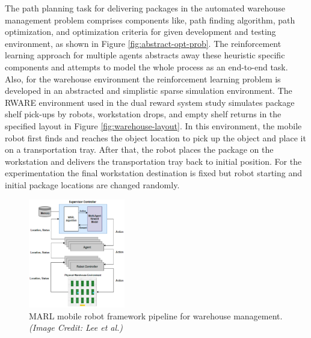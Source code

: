\documentclass{article}
\begin{document}
The path planning task for delivering packages in the automated warehouse management problem comprises components like, path finding algorithm, path optimization, and optimization criteria for given development and testing environment, as shown in Figure \ref{fig:abstract-opt-prob}.
The reinforcement learning approach for multiple agents abstracts away these heuristic specific components and attempts to model the whole process as an end-to-end task. 
Also, for the warehouse environment the reinforcement learning problem is developed in an abstracted and simplistic sparse simulation environment.
The RWARE environment used in the dual reward system study simulates package shelf pick-ups by robots, workstation drops, and empty shelf returns in the specified layout in Figure \ref{fig:warehouse-layout}.
In this environment, the mobile robot first finds and reaches the object location to pick up the object and place it on a transportation tray.
After that, the robot places the package on the workstation and delivers the transportation tray back to initial position.
For the experimentation the final workstation destination is fixed but robot starting and initial package locations are changed randomly.






\begin{figure}[h]
    \centering
    \includegraphics[width=0.375\textwidth]{reward-shaping-pipeline.png}
    \caption{MARL mobile robot framework pipeline for warehouse management. \textit{(Image Credit: Lee et al.)}}
    \label{fig:reward-shaping-pipeline}
\end{figure}
\end{document}
